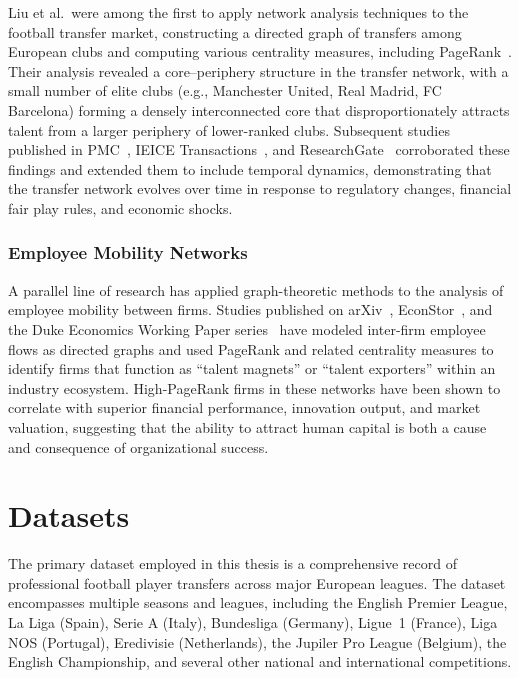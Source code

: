 Liu et al.\ were among the first to apply network analysis techniques to the football transfer market, constructing a directed graph of transfers among European clubs and computing various centrality measures, including PageRank~\cite{liu2014football}. Their analysis revealed a core--periphery structure in the transfer network, with a small number of elite clubs (e.g., Manchester United, Real Madrid, FC Barcelona) forming a densely interconnected core that disproportionately attracts talent from a larger periphery of lower-ranked clubs. Subsequent studies published in PMC~\cite{liu2014football}, IEICE Transactions~\cite{ieice2016football}, and ResearchGate~\cite{football_researchgate} corroborated these findings and extended them to include temporal dynamics, demonstrating that the transfer network evolves over time in response to regulatory changes, financial fair play rules, and economic shocks.

\subsubsection{Employee Mobility Networks}

A parallel line of research has applied graph-theoretic methods to the analysis of employee mobility between firms. Studies published on arXiv~\cite{employee_arxiv}, EconStor~\cite{employee_econstor}, and the Duke Economics Working Paper series~\cite{employee_duke} have modeled inter-firm employee flows as directed graphs and used PageRank and related centrality measures to identify firms that function as ``talent magnets'' or ``talent exporters'' within an industry ecosystem. High-PageRank firms in these networks have been shown to correlate with superior financial performance, innovation output, and market valuation, suggesting that the ability to attract human capital is both a cause and consequence of organizational success.


\section{Datasets}
\label{sec:datasets}

The primary dataset employed in this thesis is a comprehensive record of professional football player transfers across major European leagues. The dataset encompasses multiple seasons and leagues, including the English Premier League, La Liga (Spain), Serie A (Italy), Bundesliga (Germany), Ligue~1 (France), Liga NOS (Portugal), Eredivisie (Netherlands), the Jupiler Pro League (Belgium), the English Championship, and several other national and international competitions.

